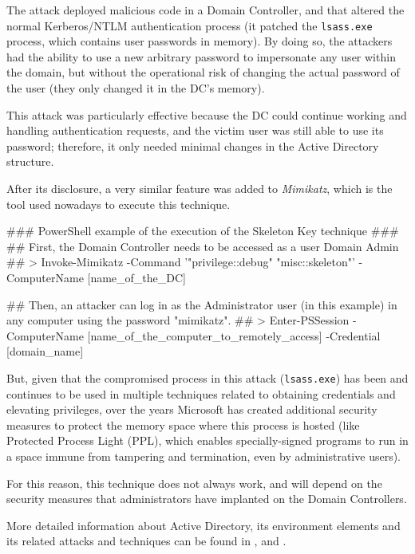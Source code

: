 \begin{itemize}
The attack deployed malicious code in a Domain Controller, and that altered the normal Kerberos/NTLM authentication process (it patched the \texttt{lsass.exe} process, which contains user passwords in memory). By doing so, the attackers had the ability to use a new arbitrary password to impersonate any user within the domain, but without the operational risk of changing the actual password of the user (they only changed it in the DC's memory). 

This attack was particularly effective because the DC could continue working and handling authentication requests, and the victim user was still able to use its password; therefore, it only needed minimal changes in the Active Directory structure.

After its disclosure, a very similar feature was added to \textit{Mimikatz}\cite{Mimikatz}, which is the tool used nowadays to execute this technique. 

\begin{spverbatim}
### PowerShell example of the execution of the Skeleton Key technique ###
## First, the Domain Controller needs to be accessed as a user Domain Admin ##
> Invoke-Mimikatz -Command '"privilege::debug" "misc::skeleton"' -ComputerName [name_of_the_DC]

## Then, an attacker can log in as the Administrator user (in this example) in any computer using the password "mimikatz". ##
> Enter-PSSession -ComputerName [name_of_the_computer_to_remotely_access] -Credential [domain_name]\Administrator 
\end{spverbatim}

But, given that the compromised process in this attack (\texttt{lsass.exe}) has been and continues to be used in multiple techniques related to obtaining credentials and elevating privileges, over the years Microsoft has created additional security measures to protect the memory space where this process is hosted (like Protected Process Light (PPL), which enables specially-signed programs to run in a space immune from tampering and termination, even by administrative users). 

For this reason, this technique does not always work, and will depend on the security measures that administrators have implanted on the Domain Controllers.



\end{itemize}

More detailed information about Active Directory, its environment elements and its related attacks and techniques can be found in \cite{AttackingAD}, \cite{DomPersistenceExplained} and \cite{DomPersistenceCommands}.